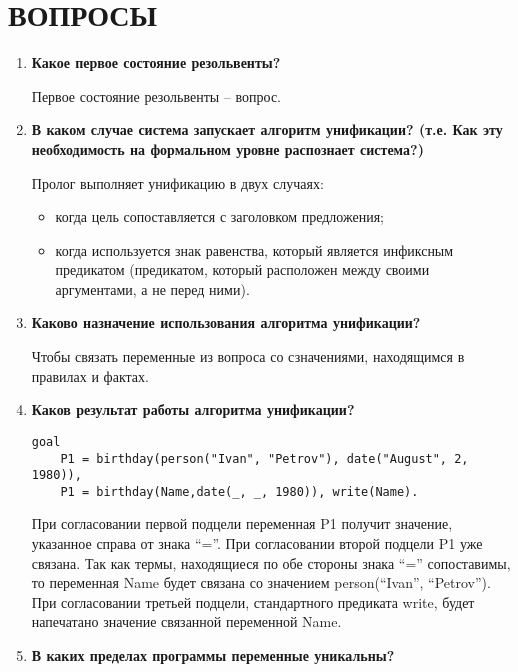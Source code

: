 \section{ВОПРОСЫ}

\begin{enumerate}
    \item \textbf{Какое первое состояние резольвенты?}

        Первое состояние резольвенты -- вопрос.

    \item \textbf{В каком случае система запускает алгоритм унификации? (т.е. Как эту необходимость на формальном уровне распознает система?)}

        Пролог выполняет унификацию в двух случаях:

        \begin{itemize}
            \item когда цель сопоставляется с заголовком предложения;
            \item когда используется знак равенства, который является инфиксным предикатом (предикатом, который расположен между своими аргументами, а не перед ними).
        \end{itemize}

    \item \textbf{Каково назначение использования алгоритма унификации? }

        Чтобы связать переменные из вопроса со сзначениями, находящимся в правилах и фактах.

    \item \textbf{Каков результат работы алгоритма унификации? }

\begin{lstlisting}
goal
    P1 = birthday(person("Ivan", "Petrov"), date("August", 2, 1980)),
    P1 = birthday(Name,date(_, _, 1980)), write(Name).
\end{lstlisting}

        При согласовании первой подцели переменная P1 получит значение, указанное справа от знака ``=''. При согласовании второй подцели P1 уже связана. Так как термы, находящиеся по обе стороны знака ``='' сопоставимы, то переменная Name будет связана со значением person(``Ivan'', ``Petrov''). При согласовании третьей подцели, стандартного предиката write, будет напечатано значение связанной переменной Name.

    \item \textbf{В каких пределах программы переменные уникальны? }


\end{enumerate}
